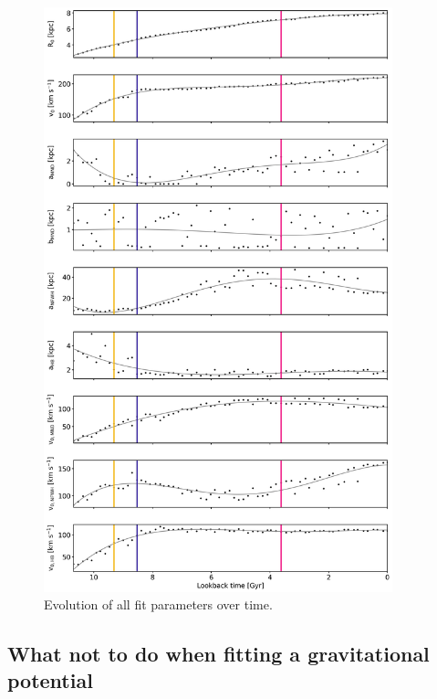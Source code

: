 \begin{figure}[htbp]
\centering
	\includegraphics[width=0.9\textwidth]{plots/Auriga/fitted_potential_evolution_dec18.png}
	\caption{Evolution of all fit parameters over time.}
	\label{fig:pot_val_evol}
\end{figure}

\subsection{What not to do when fitting a gravitational potential}





